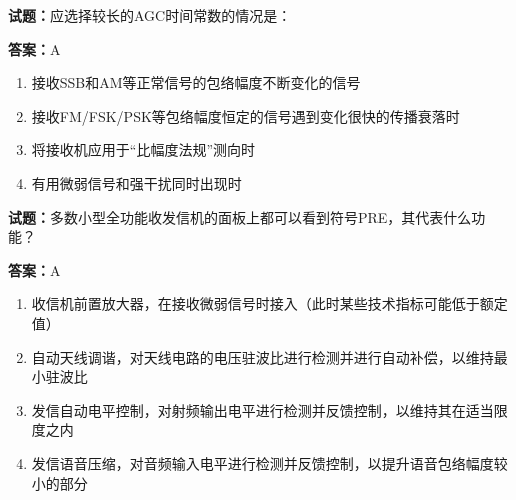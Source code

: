 \documentclass{ctexbook}
\begin{document}




\vspace{1em}

\textbf{试题：}应选择较长的AGC时间常数的情况是： 

\textbf{答案：}A 

\begin{enumerate}[leftmargin=3em]
  \item 接收SSB和AM等正常信号的包络幅度不断变化的信号 

  \item 接收FM/FSK/PSK等包络幅度恒定的信号遇到变化很快的传播衰落时 

  \item 将接收机应用于“比幅度法规”测向时 

  \item 有用微弱信号和强干扰同时出现时 

\end{enumerate}





\vspace{1em}

\textbf{试题：}多数小型全功能收发信机的面板上都可以看到符号PRE，其代表什么功能？ 

\textbf{答案：}A 

\begin{enumerate}[leftmargin=3em]
  \item 收信机前置放大器，在接收微弱信号时接入（此时某些技术指标可能低于额定值） 

  \item 自动天线调谐，对天线电路的电压驻波比进行检测并进行自动补偿，以维持最小驻波比 

  \item 发信自动电平控制，对射频输出电平进行检测并反馈控制，以维持其在适当限度之内 

  \item 发信语音压缩，对音频输入电平进行检测并反馈控制，以提升语音包络幅度较小的部分 

\end{enumerate}





\vspace{1em}
\end{document}
